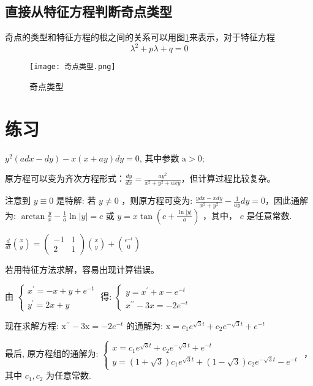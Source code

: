 \subsection{直接从特征方程判断奇点类型}
奇点的类型和特征方程的根之间的关系可以用图\ref{fig:奇点类型}来表示，对于特征方程
\[
    \lambda^2+p\lambda+q=0
\]
\begin{figure}[h]
    \centering
    \texttt{[image: 奇点类型.png]}
    \caption{奇点类型}
    \label{fig:奇点类型}
\end{figure}

\section{练习}

\begin{exercise}
    $y^2(a d x-d y)-x(x+a y) d y=0$, 其中参数 $\mathrm{a}>0$;
\end{exercise}
\begin{remark}
    原方程可以变为齐次方程形式：$\frac{dy}{dx}=\frac{ay^2}{x^2+y^2+axy}$，但计算过程比较复杂。
\end{remark}
\begin{solution}
    注意到 $y\equiv 0$ 是特解: 若 $y\ne 0$ ，则原方程可变为: $\frac{y d x-x d y}{x^2+y^2}-\frac{1}{a y} d y=0$，因此通解为: $\arctan \frac{y}{x}-\frac{1}{a} \ln |y|=c$ 或 $y=x \tan \left(c+\frac{\ln |y|}{a}\right)$ ，其中， $c$ 是任意常数.
\end{solution}

\begin{exercise}
    $\frac{d}{d t}\binom{x}{y}=\left(\begin{array}{cc}-1 & 1 \\ 2 & 1\end{array}\right)\binom{x}{y}+\binom{e^{-t}}{0}$
\end{exercise}
\begin{remark}
    若用特征方法求解，容易出现计算错误。
\end{remark}
\begin{solution}
    由 $\left\{\begin{array}{c}x^{\prime}=-x+y+e^{-t} \\ y^{\prime}=2 x+y\end{array}\right.$ 得: $\left\{\begin{array}{l}y=x^{\prime}+x-e^{-t} \\ x^{\prime \prime}-3 x=-2 e^{-t}\end{array}\right.$

    现在求解方程: $\mathrm{x}^{\prime \prime}-3 \mathrm{x}=-2 e^{-t}$ 的通解为: $\mathrm{x}=c_1 e^{\sqrt{3} t}+c_2 e^{-\sqrt{3} t}+e^{-t}$

    最后, 原方程组的通解为:
    $\left\{\begin{array}{c}x=c_1 e^{\sqrt{3} t}+c_2 e^{-\sqrt{3} t}+e^{-t} \\ y=(1+\sqrt{3}) c_1 e^{\sqrt{3} t}+(1-\sqrt{3}) c_2 e^{-\sqrt{3} t}-e^{-t}\end{array}\right.$ ，其中 $c_1, c_2$ 为任意常数.
\end{solution}


